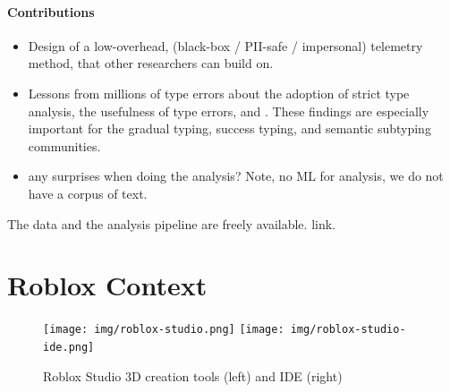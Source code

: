 \documentclass[english,submission,cleveref]{programming}
\begin{document}
\paragraph{Contributions}
\begin{itemize}
  \item
    Design of a low-overhead, (black-box / PII-safe / impersonal)
    telemetry method, that other
    researchers can build on.

  \item
    Lessons from millions of type errors about
    the adoption of strict type analysis,
    the usefulness of type errors,
    and \FILL{}.
    These findings are especially important for the
    gradual typing, success typing, and semantic subtyping communities.

  \item
    \FILL{} any surprises when doing the analysis?
    Note, no ML for analysis, we do not have a corpus of text.

\end{itemize}

The data and the analysis pipeline are freely available.
\FILL{} link.


\section{{Roblox} Context}

\begin{figure}[t]\centering
  \texttt{[image: img/roblox-studio.png]}
  \texttt{[image: img/roblox-studio-ide.png]}

  \caption{{Roblox Studio 3D creation} tools (left) and IDE (right)}
  \label{fig:roblox-studio}
\end{figure}

\end{document}
